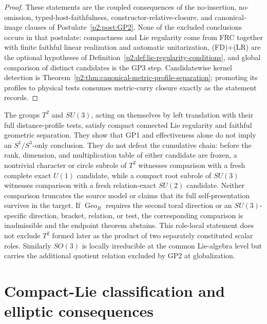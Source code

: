 \documentclass[11pt,a4paper]{article}
\begin{document}
\begin{proof}
These statements are the coupled consequences of the no-insertion,
no-omission, typed-host-faithfulness, constructor-relative-closure, and
canonical-image clauses of Postulate~\ref{p2:post:GP2}.  None of the excluded
conclusions occurs in that postulate: compactness and Lie regularity come from
FRC together with finite faithful linear realization and automatic
unitarization, (FD)+(LR) are the optional hypotheses of
Definition~\ref{p2:def:lie-regularity-conditions}, and global comparison of
distinct candidates is the GP3 step.  Candidatewise kernel detection is
Theorem~\ref{p2:thm:canonical-metric-profile-separation}; promoting its
profiles to physical tests consumes metric-curry closure exactly as the
statement records.
\end{proof}

\begin{remark}
\label{p2:rem:mode-neutrality-load-bearing}
The groups \(T^2\) and \(SU(3)\), acting on themselves by left translation
with their full distance-profile tests, satisfy compact connected Lie
regularity and faithful geometric separation.  They show that GP1 and
effectiveness alone do not imply an \(S^1/S^3\)-only conclusion.  They do not
defeat the cumulative chain: before the rank, dimension, and multiplication
table of either candidate are frozen, a nontrivial character or circle
subrole of \(T^2\) witnesses comparison with a fresh complete exact \(U(1)\)
candidate, while a compact root subrole of \(SU(3)\) witnesses comparison with
a fresh relation-exact \(SU(2)\) candidate.  Neither comparison truncates the
source model or claims that its full self-presentation survives in the target.
If \(\operatorname{Geo}_R\) requires the second toral direction or an
\(SU(3)\)-specific direction, bracket, relation, or test, the corresponding
comparison is inadmissible and the endpoint theorem abstains.  This
role-local statement does not
exclude \(T^2\) formed later as the product of two separately constituted
scalar roles.  Similarly \(SO(3)\) is locally irreducible at the common Lie-algebra level but carries the
additional quotient relation excluded by GP2 at globalization.
\end{remark}



\section{Compact-Lie classification and elliptic consequences}
\label{p2f:sec:compact-lie-elliptic}
\end{document}
